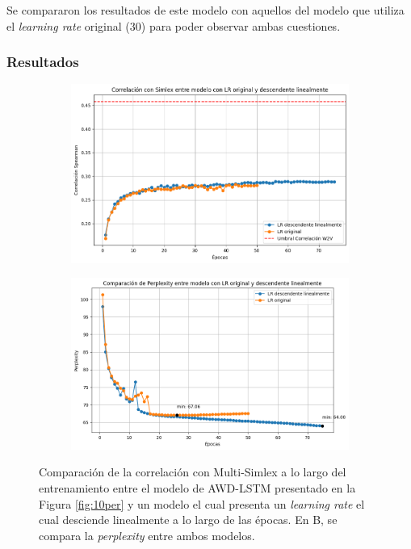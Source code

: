 Se compararon los resultados de este modelo con aquellos del modelo que utiliza 
el \textit{learning rate} original ($30$) para poder observar ambas cuestiones.

\subsubsection{Resultados}

\begin{figure}[H]
    \centering
    \begin{subfigure}[b]{0.8\textwidth}
        \centering
        \includegraphics[width=1\textwidth]{imagenes/simlex_corr_lrdescendente.png}
        \caption{}
        \label{fig:simlex_corr_lrdescendente.png}
    \end{subfigure}
    \hfill
    \begin{subfigure}[b]{0.8\textwidth}
        \centering
        \includegraphics[width=1\textwidth]{imagenes/perp_lr_descendente.png}
        \caption{}
        \label{fig:perp_lr_descendente.png}
    \end{subfigure}
    \caption{Comparación de la correlación con Multi-Simlex a lo largo del entrenamiento 
    entre el modelo de AWD-LSTM presentado en la Figura \ref{fig:10per} y un modelo el cual 
    presenta un \textit{learning rate} el cual desciende linealmente a lo largo de las 
    épocas. En B, se compara la \textit{perplexity} entre ambos modelos.}
    \label{fig:lrdescendente}
\end{figure}

